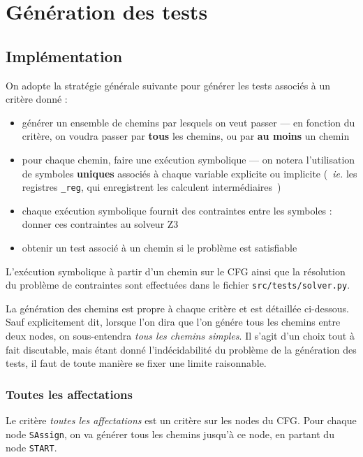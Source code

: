 \chapter{Génération des tests}

\section{Implémentation}

On adopte la stratégie générale suivante pour générer les tests associés à un
critère donné :

\begin{itemize}
	\item générer un ensemble de chemins par lesquels on veut passer --- en
	fonction du critère, on voudra passer par \textbf{tous} les chemins, ou
	par \textbf{au moins} un chemin
	\item pour chaque chemin, faire une exécution symbolique --- on notera
	l'utilisation de symboles \textbf{uniques} associés à chaque variable
	explicite ou implicite (~\textit{ie.} les registres \texttt{\_reg}, qui
	enregistrent les calculent intermédiaires~)
	\item chaque exécution symbolique fournit des contraintes entre les
	symboles : donner ces contraintes au solveur Z3
	\item obtenir un test associé à un chemin si le problème est satisfiable
\end{itemize}

\bigskip

L'exécution symbolique à partir d'un chemin sur le CFG ainsi que la résolution
du problème de contraintes sont effectuées dans le fichier
\texttt{src/tests/solver.py}.

\bigskip

La génération des chemins est propre à chaque critère et est détaillée
ci-dessous. Sauf explicitement dit, lorsque l'on dira que l'on génére tous les
chemins entre deux nodes, on sous-entendra \textit{tous les chemins simples}.
Il s'agit d'un choix tout à fait discutable, mais étant donné l'indécidabilité
du problème de la génération des tests, il faut de toute manière se fixer une
limite raisonnable.

\subsection{Toutes les affectations}

Le critère \textit{toutes les affectations} est un critère sur les nodes du
CFG. Pour chaque node \texttt{SAssign}, on va générer tous les chemins jusqu'à
ce node, en partant du node \texttt{START}.

